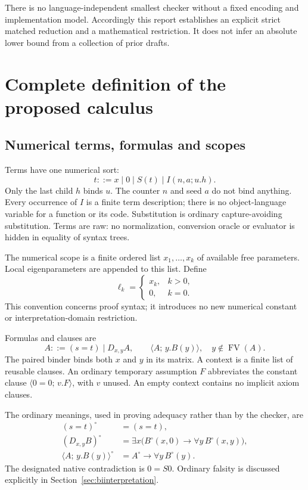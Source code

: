 \documentclass[11pt,letterpaper]{article}
\theoremstyle{definition}
\theoremstyle{remark}
\newcommand{\fv}{\operatorname{FV}}
\newcommand{\cl}[2]{\langle #1;\,#2\rangle}
\begin{document}
There is no language-independent smallest checker without a fixed
encoding and implementation model. Accordingly this report establishes
an explicit strict matched reduction and a mathematical restriction. It
does not infer an absolute lower bound from a collection of prior drafts.

\section{Complete definition of the proposed calculus}
\label{sec:bit-calculus}

\subsection{Numerical terms, formulas and scopes}

Terms have one numerical sort:
\[
 t ::= x\mid 0\mid S(t)\mid I(n,a;u.h).
\]
Only the last child $h$ binds $u$. The counter $n$ and seed $a$ do not
bind anything. Every occurrence of $I$ is a finite term description;
there is no object-language variable for a function or its code.
Substitution is ordinary capture-avoiding substitution. Terms are raw:
no normalization, conversion oracle or evaluator is hidden in equality
of syntax trees.

The numerical scope is a finite ordered list $x_1,\ldots,x_k$ of
available free parameters. Local eigenparameters are appended to this
list. Define
\[
 \ell_k=\begin{cases}x_k,&k>0,\\0,&k=0.\end{cases}
\]
This convention concerns proof syntax; it introduces no new numerical
constant or interpretation-domain restriction.

Formulas and clauses are
\[
 A ::= (s=t)\mid D_{x,y}A,
 \qquad
 \cl{A}{y.B(y)},\quad y\notin\fv(A).
\]
The paired binder binds both $x$ and $y$ in its matrix. A context is a
finite list of reusable clauses. An ordinary temporary assumption $F$
abbreviates the constant clause $\cl{0=0}{v.F}$, with $v$ unused.
An empty context contains no implicit axiom clauses.

The ordinary meanings, used in proving adequacy rather than by the
checker, are
\begin{align*}
 (s=t)^\circ&=(s=t),\\
 (D_{x,y}B)^\circ
   &=\exists x\bigl(B^\circ(x,0)\to\forall y\,B^\circ(x,y)\bigr),\\
 \cl{A}{y.B(y)}^\circ&=A^\circ\to\forall y\,B^\circ(y).
\end{align*}
The designated native contradiction is $0=S0$. Ordinary falsity is
discussed explicitly in Section~\ref{sec:biinterpretation}.
\end{document}
